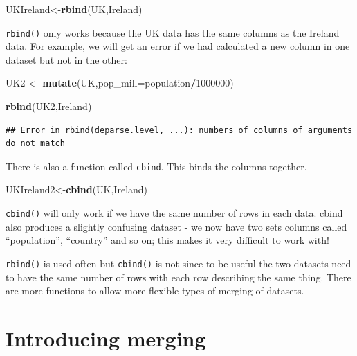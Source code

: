 \documentclass[]{book}
\newenvironment{Shaded}{\begin{snugshade}}{\end{snugshade}}
\newcommand{\DataTypeTok}[1]{\textcolor[rgb]{0.13,0.29,0.53}{#1}}
\newcommand{\DecValTok}[1]{\textcolor[rgb]{0.00,0.00,0.81}{#1}}
\newcommand{\KeywordTok}[1]{\textcolor[rgb]{0.13,0.29,0.53}{\textbf{#1}}}
\newcommand{\NormalTok}[1]{#1}
\newcommand{\OperatorTok}[1]{\textcolor[rgb]{0.81,0.36,0.00}{\textbf{#1}}}
\newcommand{\StringTok}[1]{\textcolor[rgb]{0.31,0.60,0.02}{#1}}
\begin{document}
\begin{Shaded}
\begin{Highlighting}[]
\NormalTok{UKIreland<-}\KeywordTok{rbind}\NormalTok{(UK,Ireland)}
\end{Highlighting}
\end{Shaded}

\texttt{rbind()} only works because the UK data has the same columns as the Ireland data. For example, we will get an error if we had calculated a new column in one dataset but not in the other:

\begin{Shaded}
\begin{Highlighting}[]
\NormalTok{UK2 <-}\StringTok{ }\KeywordTok{mutate}\NormalTok{(UK,}\DataTypeTok{pop_mill=}\NormalTok{population}\OperatorTok{/}\DecValTok{1000000}\NormalTok{)}

\KeywordTok{rbind}\NormalTok{(UK2,Ireland)}
\end{Highlighting}
\end{Shaded}

\begin{verbatim}
## Error in rbind(deparse.level, ...): numbers of columns of arguments do not match
\end{verbatim}

There is also a function called \texttt{cbind}. This binds the columns together.

\begin{Shaded}
\begin{Highlighting}[]
\NormalTok{UKIreland2<-}\KeywordTok{cbind}\NormalTok{(UK,Ireland)}
\end{Highlighting}
\end{Shaded}

\texttt{cbind()} will only work if we have the same number of rows in each data. cbind also produces a slightly confusing dataset - we now have two sets columns called ``population'', ``country'' and so on; this makes it very difficult to work with!

\texttt{rbind()} is used often but \texttt{cbind()} is not since to be useful the two datasets need to have the same number of rows with each row describing the same thing. There are more functions to allow more flexible types of merging of datasets.

\hypertarget{introducing-merging}{%
\section{Introducing merging}\label{introducing-merging}}
\end{document}
